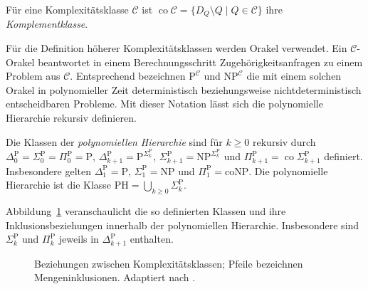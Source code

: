 \begin{Definition}[Komplementklasse]
    Für eine Komplexitätsklasse \(\mathcal{C}\) ist
    \(\operatorname{co}\mathcal{C}
    =\{D_Q\setminus Q\mid Q\in\mathcal{C}\}\) ihre
    \emph{Komplementklasse}.
\end{Definition}
Für die Definition höherer Komplexitätsklassen werden Orakel verwendet.
Ein \(\mathcal{C}\)-Orakel beantwortet in einem Berechnungsschritt
Zugehörigkeitsanfragen zu einem Problem aus \(\mathcal{C}\).
Entsprechend bezeichnen \(\mathrm{P}^{\mathcal{C}}\) und
\(\mathrm{NP}^{\mathcal{C}}\) die mit einem solchen Orakel in
polynomieller Zeit deterministisch beziehungsweise nichtdeterministisch
entscheidbaren Probleme. Mit dieser Notation lässt sich die polynomielle
Hierarchie rekursiv definieren.
\begin{Definition}
    \label{def:polynomial-hierarchy}
    Die Klassen der \emph{polynomiellen Hierarchie} sind für
    \(k\geq 0\) rekursiv durch
    \(\Delta_0^{\mathrm{P}}=\Sigma_0^{\mathrm{P}}
    =\Pi_0^{\mathrm{P}}=\mathrm{P}\),
    \(\Delta_{k+1}^{\mathrm{P}}
    =\mathrm{P}^{\Sigma_k^{\mathrm{P}}}\),
    \(\Sigma_{k+1}^{\mathrm{P}}
    =\mathrm{NP}^{\Sigma_k^{\mathrm{P}}}\) und
    \(\Pi_{k+1}^{\mathrm{P}}
    =\operatorname{co}\Sigma_{k+1}^{\mathrm{P}}\) definiert.
    Insbesondere gelten
    \(\Delta_1^{\mathrm{P}}=\mathrm{P}\),
    \(\Sigma_1^{\mathrm{P}}=\mathrm{NP}\) und
    \(\Pi_1^{\mathrm{P}}=\mathrm{coNP}\).
    Die polynomielle Hierarchie ist die Klasse
    \(\mathrm{PH}=\bigcup_{k\geq 0}\Sigma_k^{\mathrm{P}}\).
\end{Definition}

Abbildung~\ref{fig:polynomielle-hierarchie} veranschaulicht die so
definierten Klassen und ihre Inklusionsbeziehungen innerhalb der
polynomiellen Hierarchie. Insbesondere sind
\(\Sigma_k^{\mathrm{P}}\) und \(\Pi_k^{\mathrm{P}}\) jeweils in
\(\Delta_{k+1}^{\mathrm{P}}\) enthalten.

\begin{figure}[htbp]
    \centering
    
    \caption[Beziehungen zwischen Komplexit\"atsklassen]{Beziehungen zwischen
    Komplexit\"atsklassen; Pfeile bezeichnen
    Mengeninklusionen. Adaptiert nach
    \cite[Abb.~6.1]{rapberger:2023:unpacking-argument}.}
    \label{fig:polynomielle-hierarchie}
\end{figure}

